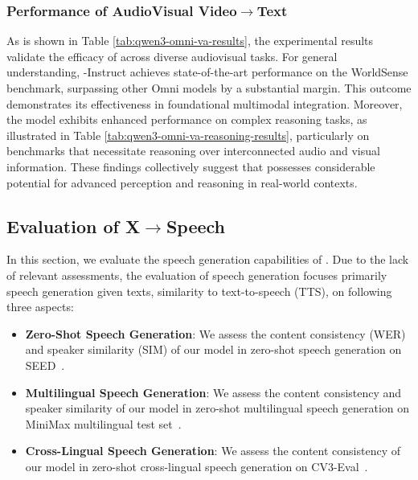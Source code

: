 % 


\subsubsection{Performance of AudioVisual Video$\to$Text}
As is shown in Table \ref{tab:qwen3-omni-va-results}, the experimental results validate the efficacy of \method across diverse audiovisual tasks. For general understanding, \method-Instruct achieves state-of-the-art performance on the WorldSense benchmark, surpassing other Omni models by a substantial margin. This outcome demonstrates its effectiveness in foundational multimodal integration. Moreover, the model exhibits enhanced performance on complex reasoning tasks, as illustrated in Table \ref{tab:qwen3-omni-va-reasoning-results}, particularly on benchmarks that necessitate reasoning over interconnected audio and visual information. These findings collectively suggest that \method possesses considerable potential for advanced perception and reasoning in real-world contexts.



\subsection{Evaluation of X$\to$Speech}
In this section, we evaluate the speech generation capabilities of \method. Due to the lack of relevant assessments, the evaluation of speech generation focuses primarily speech generation given texts, similarity to text-to-speech (TTS), on following three aspects:

\begin{itemize}
    \item \textbf{Zero-Shot Speech Generation}: We assess the content consistency (WER) and speaker similarity (SIM) of our model in zero-shot speech generation on SEED~\citep{seedtts}.
    \item \textbf{Multilingual Speech Generation}: We assess the content consistency and speaker similarity of our model in zero-shot multilingual speech generation on MiniMax multilingual test set~\citep{minimaxspeech}.
    \item \textbf{Cross-Lingual Speech Generation}: We assess the content consistency of our model in zero-shot cross-lingual speech generation on CV3-Eval~\citep{cosyvoice3}.
\end{itemize}



